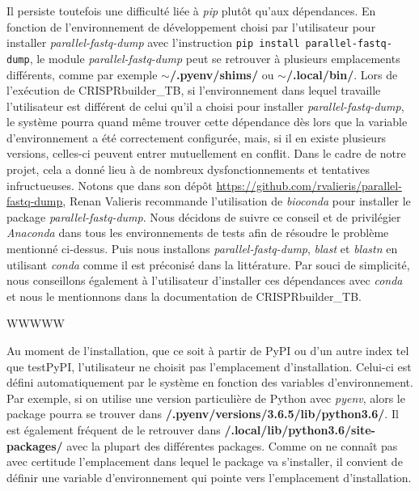 \documentclass[twoside,a4paper,11pt,frenchb,openany]{report}
\begin{document}
Il persiste toutefois une difficulté liée à \textit{pip} plutôt qu'aux dépendances. En fonction de l'environnement de développement choisi par l'utilisateur pour installer \textit{parallel-fastq-dump} avec l'instruction \texttt{pip install parallel-fastq-dump}, le module \textit{parallel-fastq-dump} peut se retrouver à plusieurs emplacements différents, comme par exemple \textbf{$\sim$/.pyenv/shims/} ou \textbf{$\sim$/.local/bin/}. Lors de l'exécution de CRISPRbuilder\_TB, si l'environnement dans lequel travaille l'utilisateur est différent de celui qu'il a choisi pour installer \textit{parallel-fastq-dump}, le système pourra quand même trouver cette dépendance dès lors que la variable d'environnement a été correctement configurée, mais, si il en existe plusieurs versions, celles-ci peuvent entrer mutuellement en conflit. Dans le cadre de notre projet, cela a donné lieu à de nombreux dysfonctionnements et tentatives infructueuses. Notons que dans son dépôt \url{https://github.com/rvalieris/parallel-fastq-dump}, Renan Valieris recommande l'utilisation de \textit{bioconda} pour installer le package \textit{parallel-fastq-dump}. Nous décidons de suivre ce conseil et de privilégier \textit{Anaconda} dans tous les environnements de tests afin de résoudre le problème mentionné ci-dessus. Puis nous installons \textit{parallel-fastq-dump}, \textit{blast} et \textit{blastn} en utilisant \textit{conda} comme il est préconisé dans la littérature. Par souci de simplicité, nous conseillons également à l'utilisateur d'installer ces dépendances avec \textit{conda} et nous le mentionnons dans la documentation de CRISPRbuilder\_TB.





WWWWW

Au moment de l'installation, que ce soit à partir de PyPI ou d'un autre index tel que
testPyPI, l'utilisateur ne choisit pas l'emplacement d'installation. Celui-ci est défini automatiquement par le système en fonction des variables d'environnement. Par exemple, si on utilise une version particulière de Python avec \textit{pyenv}, alors le package pourra se trouver dans \textbf{\raisebox{-1ex}{\textasciitilde}/.pyenv/versions/3.6.5/lib/python3.6/}. Il est également fréquent de le retrouver dans \textbf{\raisebox{-1ex}{\textasciitilde}/.local/lib/python3.6/site-packages/} avec la plupart des différentes packages. Comme on ne connaît pas avec certitude l'emplacement dans lequel le package va s'installer, il convient de définir une variable d'environnement qui pointe vers l'emplacement d'installation.
\end{document}
